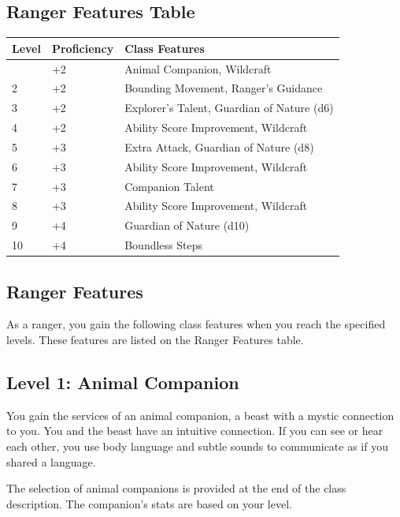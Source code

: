 \documentclass[12pt,letterpaper,twocolumn,openany,nodeprecatedcode,bg=none]{dndbook}
\begin{document}
\subsection{Ranger Features Table}\label{ranger-features-table}

\begin{longtable}[]{@{}lll@{}}
\toprule\noalign{}
Level & Proficiency & Class Features \\
\midrule\noalign{}
\endhead
\bottomrule\noalign{}
\endlastfoot
1 & +2 & Animal Companion, Wildcraft \\
2 & +2 & Bounding Movement, Ranger's Guidance \\
3 & +2 & Explorer's Talent, Guardian of Nature (d6) \\
4 & +2 & Ability Score Improvement, Wildcraft \\
5 & +3 & Extra Attack, Guardian of Nature (d8) \\
6 & +3 & Ability Score Improvement, Wildcraft \\
7 & +3 & Companion Talent \\
8 & +3 & Ability Score Improvement, Wildcraft \\
9 & +4 & Guardian of Nature (d10) \\
10 & +4 & Boundless Steps \\
\end{longtable}

\twocolumn

\subsection{Ranger Features}\label{ranger-features}

As a ranger, you gain the following class features when you reach the
specified levels. These features are listed on the Ranger Features
table.

\subsection{Level 1: Animal Companion}\label{level-1-animal-companion}

You gain the services of an animal companion, a beast with a mystic
connection to you. You and the beast have an intuitive connection. If
you can see or hear each other, you use body language and subtle sounds
to communicate as if you shared a language.

The selection of animal companions is provided at the end of the class
description. The companion's stats are based on your level.
\end{document}
